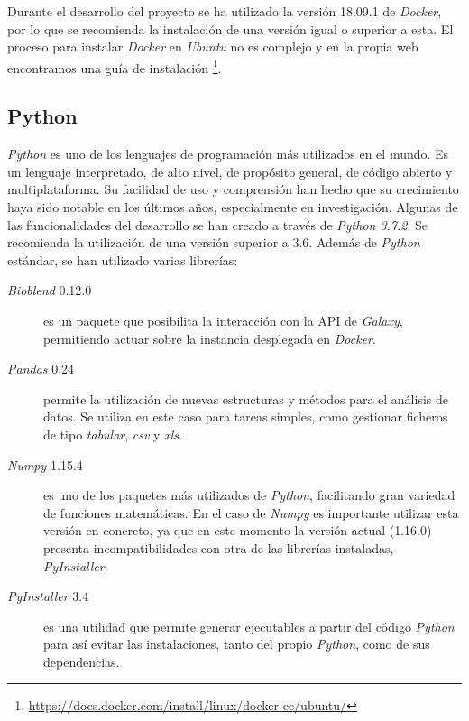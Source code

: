     Durante el desarrollo del proyecto se ha utilizado la versión 18.09.1 de \textit{Docker}, por lo que se recomienda la instalación de una versión igual o superior a esta. El proceso para instalar \textit{Docker} en \textit{Ubuntu} no es complejo y en la propia web encontramos una guía de instalación \footnote{\url{https://docs.docker.com/install/linux/docker-ce/ubuntu/}}.


    \subsection{Python}
    \textit{Python} es uno de los lenguajes de programación más utilizados en el mundo. Es un lenguaje interpretado, de alto nivel, de propósito general, de código abierto y multiplataforma. Su facilidad de uso y comprensión han hecho que su crecimiento haya sido notable en los últimos años, especialmente en investigación.
    Algunas de las funcionalidades del desarrollo se han creado a través de \textit{Python 3.7.2}. Se recomienda la utilización de una versión superior a 3.6. Además de \textit{Python} estándar, se han utilizado varias librerías:
        \begin{description}
            
            \item[\textit{Bioblend} 0.12.0] es un paquete que posibilita la interacción con la API de \textit{Galaxy}, permitiendo actuar sobre la instancia desplegada en \textit{Docker}.
            
            \item[\textit{Pandas} 0.24] permite la utilización de nuevas estructuras y métodos para el análisis de datos. Se utiliza en este caso para tareas simples, como gestionar ficheros de tipo \textit{tabular}, \textit{csv} y \textit{xls}.
            
            \item[\textit{Numpy} 1.15.4] es uno de los paquetes más utilizados de \textit{Python}, facilitando gran variedad de funciones matemáticas. En el caso de \textit{Numpy} es importante utilizar esta versión en concreto, ya que en este momento la versión actual (1.16.0) presenta incompatibilidades con otra de las librerías instaladas, \textit{PyInstaller}.
            
            \item[\textit{PyInstaller} 3.4] es una utilidad que permite generar ejecutables a partir del código \textit{Python} para así evitar las instalaciones, tanto del propio \textit{Python}, como de sus dependencias.
        
        \end{description}
    
